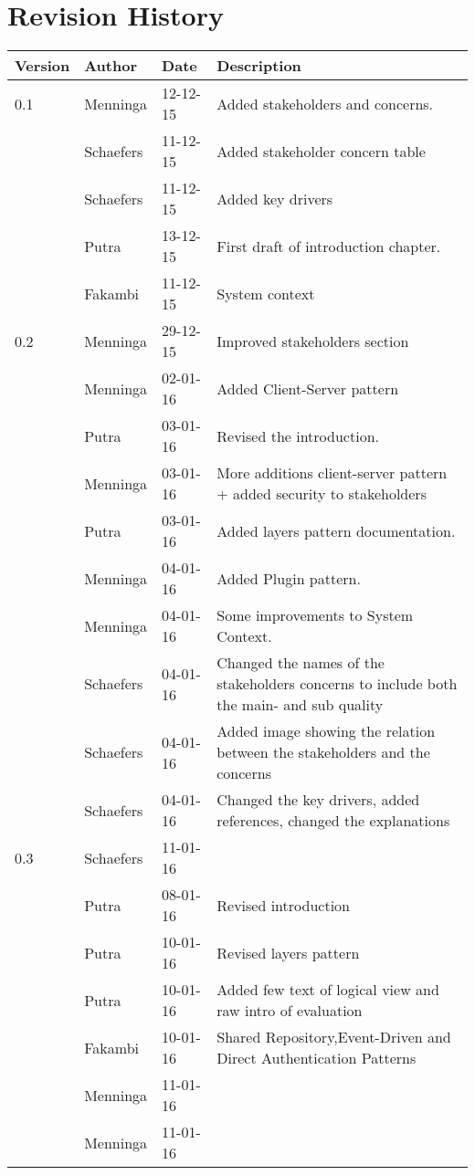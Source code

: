 \section*{Revision History}
\begin{longtable}{L{} L{} L{} L{}}
	\textbf{Version} & \textbf{Author}       & \textbf{Date} & \textbf{Description}                                                                                                                                                                                                       \\ \endhead	\toprule
				0.1 & Menninga  & 12-12-15 & Added stakeholders and concerns. \\
					& Schaefers & 11-12-15 & Added stakeholder concern table\\
					& Schaefers & 11-12-15 & Added key drivers\\
					& Putra		& 13-12-15 & First draft of introduction chapter. \\
					& Fakambi   & 11-12-15 & System context\\
				\midrule
			
				0.2 & Menninga  & 29-12-15 & Improved stakeholders section \\
					& Menninga  & 02-01-16 & Added Client-Server pattern \\
					& Putra		& 03-01-16 & Revised the introduction. \\
					& Menninga  & 03-01-16 & More additions client-server pattern + added security to stakeholders \\
					& Putra		& 03-01-16 & Added layers pattern documentation. \\
					& Menninga	& 04-01-16 & Added Plugin pattern. \\
					& Menninga  & 04-01-16 & Some improvements to System Context. \\
					& Schaefers & 04-01-16 & Changed the names of the stakeholders concerns to include both the main- and sub quality \\
					& Schaefers & 04-01-16 & Added image showing the relation between the stakeholders and the concerns \\
					& Schaefers & 04-01-16 & Changed the key drivers, added references, changed the explanations \\
				\midrule

				0.3 & Schaefers & 11-01-16 & \\
					& Putra		& 08-01-16 & Revised introduction \\
					& Putra		& 10-01-16 & Revised layers pattern \\
					& Putra		& 10-01-16 & Added few text of logical view and raw intro of evaluation \\
					& Fakambi   & 10-01-16 & Shared Repository,Event-Driven and Direct Authentication Patterns\\
					& Menninga  & 11-01-16 & \\
					& Menninga  & 11-01-16 & \\
				\midrule


\end{longtable}
